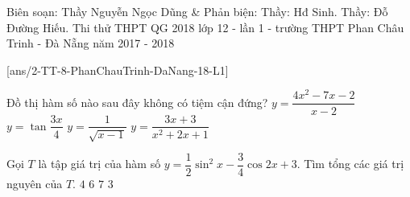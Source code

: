 \begin{name}
	{Biên soạn: Thầy Nguyễn Ngọc Dũng \& Phản biện: Thầy: Hđ Sinh. Thầy: Đỗ Đường Hiếu.}
	{Thi thử THPT QG 2018 lớp 12 - lần 1 - trường THPT Phan Châu Trinh - Đà Nẵng năm 2017 - 2018}
\end{name}

\setcounter{ex}{0}
[ans/2-TT-8-PhanChauTrinh-DaNang-18-L1]

\begin{ex}%
	Đồ thị hàm số nào sau đây không có tiệm cận đứng?
	\choice
	{\True $y=\dfrac{4x^2-7x-2}{x-2}$}
	{$y=\tan \dfrac{3x}{4}$}
	{$y=\dfrac{1}{\sqrt{x-1}}$}
	{$y=\dfrac{3x+3}{x^2+2x+1}$}
\end{ex}

\begin{ex}%
	Gọi $T$ là tập giá trị của hàm số $y=\dfrac{1}{2}\sin ^2 x-\dfrac{3}{4}\cos 2x +3$. Tìm tổng các giá trị nguyên của $T$.
	\choice
	{$4$}
	{$6$}
	{\True $7$}
	{$3$}
\end{ex}


